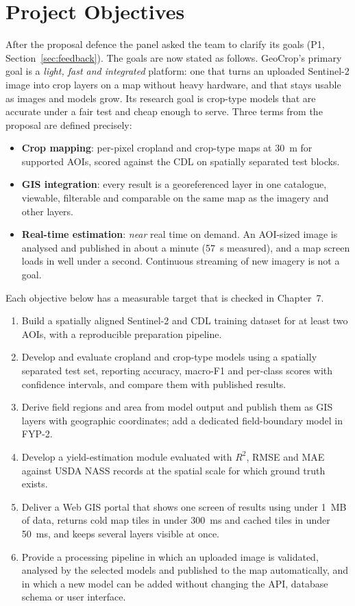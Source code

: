 \section{Project Objectives}\label{sec:goals}
After the proposal defence the panel asked the team to clarify its goals (P1,
Section~\ref{sec:feedback}). The goals are now stated as follows. GeoCrop's primary goal is a
\emph{light, fast and integrated} platform: one that turns an uploaded Sentinel-2 image into crop
layers on a map without heavy hardware, and that stays usable as images and models grow. Its
research goal is crop-type models that are accurate under a fair test and cheap enough to serve.
Three terms from the proposal are defined precisely:
\begin{itemize}
  \item \textbf{Crop mapping}: per-pixel cropland and crop-type maps at 30~m for supported AOIs,
        scored against the CDL on spatially separated test blocks.
  \item \textbf{GIS integration}: every result is a georeferenced layer in one catalogue, viewable,
        filterable and comparable on the same map as the imagery and other layers.
  \item \textbf{Real-time estimation}: \emph{near} real time on demand. An AOI-sized image is analysed
        and published in about a minute (57~s measured), and a map screen loads in well under a
        second. Continuous streaming of new imagery is not a goal.
\end{itemize}
Each objective below has a measurable target that is checked in Chapter~7.
\begin{enumerate}[label=\textbf{O\arabic*.}, leftmargin=1.1cm]
  \item Build a spatially aligned Sentinel-2 and CDL training dataset for at least two AOIs, with
        a reproducible preparation pipeline.
  \item Develop and evaluate cropland and crop-type models using a spatially separated test set,
        reporting accuracy, macro-F1 and per-class scores with confidence intervals, and compare
        them with published results.
  \item Derive field regions and area from model output and publish them as GIS layers with
        geographic coordinates; add a dedicated field-boundary model in FYP-2.
  \item Develop a yield-estimation module evaluated with $R^2$, RMSE and MAE against USDA NASS
        records at the spatial scale for which ground truth exists.
  \item Deliver a Web GIS portal that shows one screen of results using under 1~MB of data, returns
        cold map tiles in under 300~ms and cached tiles in under 50~ms, and keeps several layers
        visible at once.
  \item Provide a processing pipeline in which an uploaded image is validated, analysed by the
        selected models and published to the map automatically, and in which a new model can be
        added without changing the API, database schema or user interface.
\end{enumerate}

